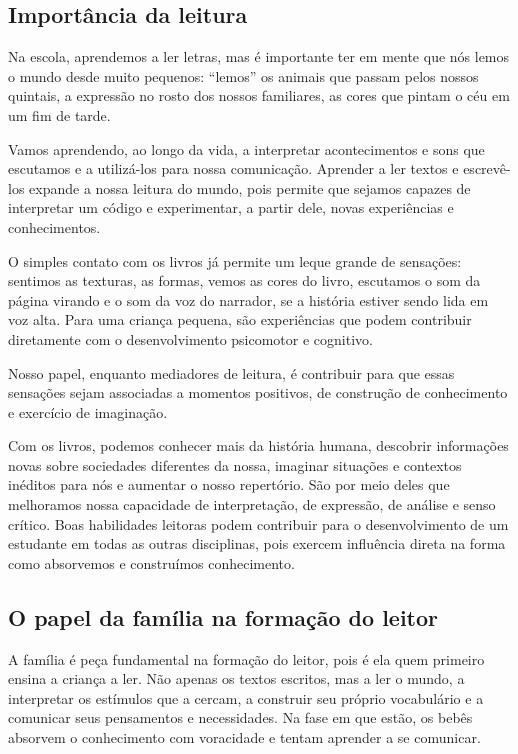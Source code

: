 \documentclass[11pt]{extarticle}
\begin{document}
\subsection{Importância da leitura}
Na escola, aprendemos a ler letras, mas é importante ter em mente que nós 
lemos o mundo desde muito pequenos: “lemos” os animais que passam pelos nossos 
quintais, a expressão no rosto dos nossos familiares, as cores que pintam o céu 
em um fim de tarde. 

Vamos aprendendo, ao longo da vida, a interpretar acontecimentos 
e sons que escutamos e a utilizá-los para nossa comunicação. Aprender a ler textos e 
escrevê-los expande a nossa leitura do mundo, pois permite que sejamos capazes de 
interpretar um código e experimentar, a partir dele, novas experiências e conhecimentos. 

O simples contato com os livros já permite um leque grande de sensações: 
sentimos as texturas, as formas, vemos as cores do livro, escutamos o som da página 
virando e o som da voz do narrador, se a história estiver sendo lida em voz alta. Para uma 
criança pequena, são experiências que podem contribuir diretamente com o desenvolvimento psicomotor 
e cognitivo. 

Nosso papel, enquanto mediadores de leitura, é contribuir para que essas 
sensações sejam associadas a momentos positivos, de construção de 
conhecimento e exercício de imaginação. 

Com os livros, podemos conhecer mais da história humana, descobrir informações 
novas sobre sociedades diferentes da nossa, imaginar situações e contextos inéditos 
para nós e aumentar o nosso repertório. São por meio deles que melhoramos nossa 
capacidade de interpretação, de expressão, de análise e senso crítico. Boas habilidades 
leitoras podem contribuir para o desenvolvimento de um estudante em todas as outras 
disciplinas, pois exercem influência direta na forma como absorvemos e 
construímos conhecimento.


\subsection{O papel da família na formação do leitor}
A família é peça fundamental na formação do leitor, pois é ela quem primeiro 
ensina a criança a ler. Não apenas os textos escritos, mas a ler o mundo, a 
interpretar os estímulos que a cercam, a construir seu próprio vocabulário e a 
comunicar seus pensamentos e necessidades. Na fase em que estão, os bebês 
absorvem o conhecimento com voracidade e tentam aprender a se comunicar. 
\end{document}
